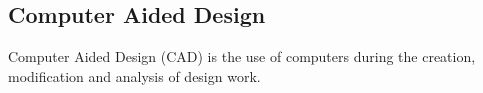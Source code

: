 
\subsection{Computer Aided Design} %
\label{sub:computer_aided_design}
Computer Aided Design (CAD) is the use of computers during the creation, modification and analysis of design work. 


